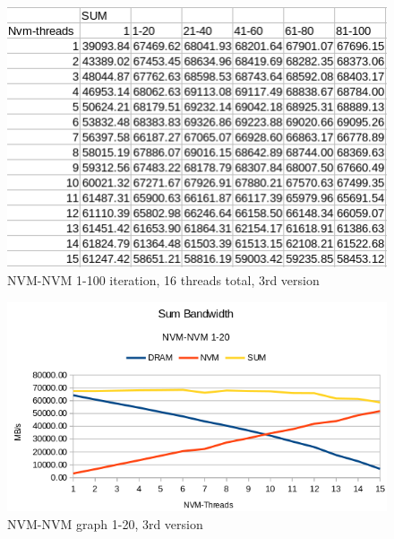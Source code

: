 \documentclass[12pt,a4paper,USenglish]{article}      %
\begin{document}
\begin{figure}[!hbtp]
\includegraphics[scale=0.7]{NVM-NVM_table_p2_1-100_v3}
\caption{NVM-NVM 1-100 iteration, 16 threads total, 3rd version}
\end{figure}

\begin{figure}[!hbtp]
\includegraphics[scale=0.7]{NVM-NVM_Graph_1-20_v3}
\caption{NVM-NVM graph 1-20, 3rd version}
\end{figure}

\clearpage
\end{document}
